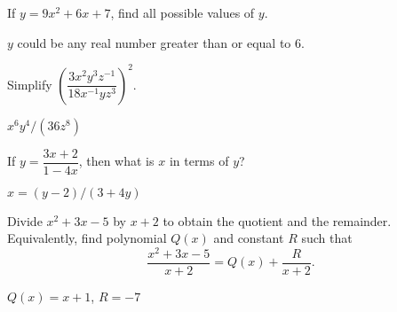 \begin{enumialphparenastyle}
\begin{multicols}{2}
\begin{ex}
If $y=9x^2+6x+7$, find all possible values of $y$.
\begin{sol}
	$y$ could be any real number greater than or equal to 6.
\end{sol}
\end{ex}

\begin{ex}
Simplify $\left(\dfrac{3x^2 y^3 z^{-1}}{18x^{-1}yz^3}\right)^2$.
\begin{sol}
	$x^6 y^4/(36z^8)$
\end{sol}
\end{ex}

\begin{ex}
If $y=\dfrac{3x+2}{1-4x}$, then what is $x$ in
terms of $y$?
\begin{sol}
	$x=(y-2)/(3+4y)$
\end{sol}
\end{ex}

\vfill \null
\columnbreak
\begin{ex}
Divide $x^2+3x-5$ by $x+2$ to obtain the
quotient and the remainder. Equivalently, find polynomial $Q(x)$
and constant $R$ such that
\[\frac{x^2+3x-5}{x+2}=Q(x)+\frac{R}{x+2}.\]
\begin{sol}
	$Q(x)=x+1$, $R=-7$
\end{sol}
\end{ex}

\end{multicols}

\end{enumialphparenastyle}